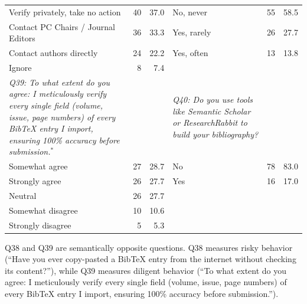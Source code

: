 \begin{table}[htbp]
\begin{threeparttable}
\begin{tabular}{p{6cm}rr|p{6cm}rr}
\rowcolor{tableRowLight}
Verify privately, take no action & 40 & 37.0 & No, never & 55 & 58.5 \\
Contact PC Chairs / Journal Editors & 36 & 33.3 & Yes, rarely & 26 & 27.7 \\
\rowcolor{tableRowLight}
Contact authors directly & 24 & 22.2 & Yes, often & 13 & 13.8 \\
Ignore & 8 & 7.4 &  &  &  \\
\midrule
\textit{Q39: To what extent do you agree: I meticulously verify every single field (volume, issue, page numbers) of every BibTeX entry I import, ensuring 100\% accuracy before submission.}$^*$ & & & \textit{Q40: Do you use tools like Semantic Scholar or ResearchRabbit to build your bibliography?} & & \\
\rowcolor{tableRowLight}
Somewhat agree & 27 & 28.7 & No & 78 & 83.0 \\
Strongly agree & 26 & 27.7 & Yes & 16 & 17.0 \\
\rowcolor{tableRowLight}
Neutral & 26 & 27.7 &  &  &  \\
Somewhat disagree & 10 & 10.6 &  &  &  \\
\rowcolor{tableRowLight}
Strongly disagree & 5 & 5.3 &  &  &  \\
\bottomrule
\end{tabular}

\begin{tablenotes}
\footnotesize
Q38 and Q39 are semantically opposite questions. Q38 measures risky behavior (``Have you ever copy-pasted a BibTeX entry from the internet without checking its content?''), while Q39 measures diligent behavior (``To what extent do you agree: I meticulously verify every single field (volume, issue, page numbers) of every BibTeX entry I import, ensuring 100\% accuracy before submission.'').
\end{tablenotes}
\end{threeparttable}
\end{table}

